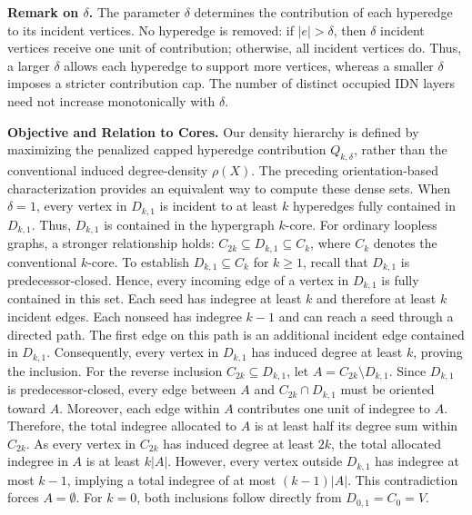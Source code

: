 \documentclass[twocolumn]{svjour3}
\newcommand{\stitle}[1]{\par\noindent\textbf{#1}}
\begin{document}
\stitle{Remark on $\delta$.}
The parameter $\delta$ determines the contribution of each hyperedge to its incident vertices.
No hyperedge is removed: if $|e|>\delta$, then $\delta$ incident vertices receive one unit of contribution; otherwise, all incident vertices do.
Thus, a larger $\delta$ allows each hyperedge to support more vertices, whereas a smaller $\delta$ imposes a stricter contribution cap. The number of distinct occupied IDN layers need not increase monotonically with $\delta$.



\stitle{Objective and Relation to Cores.}
Our density hierarchy is defined by maximizing the penalized capped hyperedge contribution $Q_{k,\delta}$, rather than the conventional induced degree-density $\rho(X)$. The preceding orientation-based characterization provides an equivalent way to compute these dense sets.
When $\delta=1$, every vertex in $D_{k,1}$ is incident to at least $k$ hyperedges fully contained in $D_{k,1}$. Thus, $D_{k,1}$ is contained in the hypergraph $k$-core. For ordinary loopless graphs, a stronger relationship holds:
$C_{2k}\subseteq D_{k,1}\subseteq C_k$,
where $C_k$ denotes the conventional $k$-core.
To establish $D_{k,1}\subseteq C_k$ for $k\ge1$, recall that $D_{k,1}$ is predecessor-closed. Hence, every incoming edge of a vertex in $D_{k,1}$ is fully contained in this set. Each seed has indegree at least $k$ and therefore at least $k$ incident edges. Each nonseed has indegree $k-1$ and can reach a seed through a directed path. The first edge on this path is an additional incident edge contained in $D_{k,1}$. Consequently, every vertex in $D_{k,1}$ has induced degree at least $k$, proving the inclusion.
For the reverse inclusion $C_{2k}\subseteq D_{k,1}$, let $A=C_{2k}\setminus D_{k,1}$. Since $D_{k,1}$ is predecessor-closed, every edge between $A$ and $C_{2k}\cap D_{k,1}$ must be oriented toward $A$. Moreover, each edge within $A$ contributes one unit of indegree to $A$. Therefore, the total indegree allocated to $A$ is at least half its degree sum within $C_{2k}$. As every vertex in $C_{2k}$ has induced degree at least $2k$, the total allocated indegree in $A$ is at least $k|A|$. However, every vertex outside $D_{k,1}$ has indegree at most $k-1$, implying a total indegree of at most $(k-1)|A|$. This contradiction forces $A=\emptyset$. For $k=0$, both inclusions follow directly from $D_{0,1}=C_0=V$.
\end{document}
